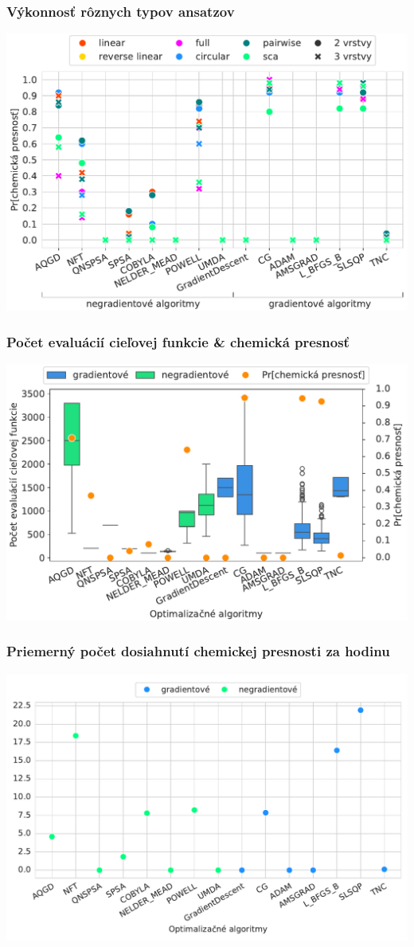 \documentclass{beamer}
\begin{document}
\begin{frame}
    \frametitle{Výkonnosť rôznych typov ansatzov}
	\includegraphics[width=1\textwidth]{chemical-sk.pdf}
\end{frame}

\begin{frame}
    \frametitle{Počet evaluácií cieľovej funkcie \& chemická presnosť} 
	\includegraphics[width=1\textwidth]{evaluations-sk.pdf}
\end{frame}

\begin{frame}
    \frametitle{Priemerný počet dosiahnutí chemickej presnosti za hodinu}
	\includegraphics[width=1\textwidth]{hours-sk.pdf}
\end{frame}
\end{document}
